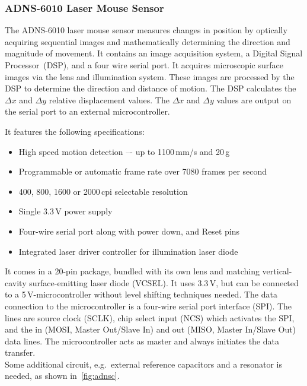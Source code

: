 \documentclass[12pt,a4paper]{article}
\begin{document}
\subsubsection{ADNS-6010 Laser Mouse Sensor}

The ADNS-6010 laser mouse sensor measures changes in position by optically acquiring sequential images and mathematically determining the direction and magnitude of movement.
It contains an image acquisition system, a Digital Signal Processor~(DSP), and a four wire serial port.
It acquires microscopic surface images via the lens and illumination system. 
These images are processed by the DSP to determine the direction and distance of motion. 
The DSP calculates the $\Delta x$ and $\Delta y$ relative displacement values. 
The $\Delta x$ and $\Delta y$ values are output on the serial port to an external microcontroller.~\cite{adns}

 
It features the following specifications:
\begin{itemize}
 \item High speed motion detection –- up to 1100\,mm/s and 20\,g
 \item Programmable or automatic frame rate over 7080 frames per second
 \item 400, 800, 1600 or 2000\,cpi selectable resolution
 \item Single 3.3\,V power supply
 \item Four-wire serial port along with power down, and Reset pins
 \item Integrated laser driver controller for illumination laser diode
\end{itemize}

It comes in a 20-pin package, bundled with its own lens and matching vertical-cavity surface-emitting laser diode (VCSEL).
It uses 3.3\,V, but can be connected to a 5\,V-microcontroller without level shifting techniques needed.
The data connection to the microcontroller is a four-wire serial port interface (SPI).
The lines are source clock (SCLK), chip select input (NCS) which activates the SPI, and the in (MOSI, Master Out/Slave In) and out (MISO, Master In/Slave Out) data lines.
The microcontroller acts as master and always initiates the data transfer.\\
Some additional circuit, e.g.\ external reference capacitors and a resonator is needed, as shown in~\autoref{fig:adnsc}.
\end{document}

